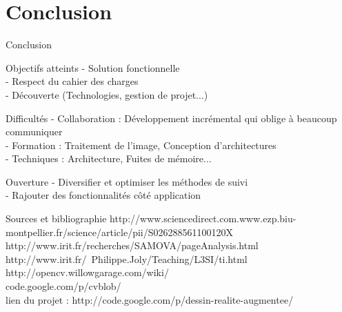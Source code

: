 \documentclass{beamer}
\begin{document}
	\section{Conclusion}
		\begin{frame}{Conclusion}
			\begin{exampleblock}{Objectifs atteints}
				- Solution fonctionnelle \\
				- Respect du cahier des charges \\
				- Découverte (Technologies, gestion de projet...) \\ 
			\end{exampleblock}
			\pause
			\begin{alertblock}{Difficultés}
				- Collaboration : Développement incrémental qui oblige à beaucoup communiquer \\
				- Formation : Traitement de l'image, Conception d'architectures \\
				- Techniques : Architecture, Fuites de mémoire...\\
			\end{alertblock}
			\pause
			\begin{block}{Ouverture}
				- Diversifier et optimiser les méthodes de suivi \\
				- Rajouter des fonctionnalités côté application \\
			\end{block}
		\end{frame}
	
	\begin{frame}{Sources et bibliographie}
  http://www.sciencedirect.com.www.ezp.biu-montpellier.fr/science/article/pii/S026288561100120X \\
  http://www.irit.fr/recherches/SAMOVA/pageAnalysis.html\\
  http://www.irit.fr/~Philippe.Joly/Teaching/L3SI/ti.html\\
  http://opencv.willowgarage.com/wiki/\\
  code.google.com/p/cvblob/ \\
  lien du projet : http://code.google.com/p/dessin-realite-augmentee/ \\
	\end{frame}
\end{document}
